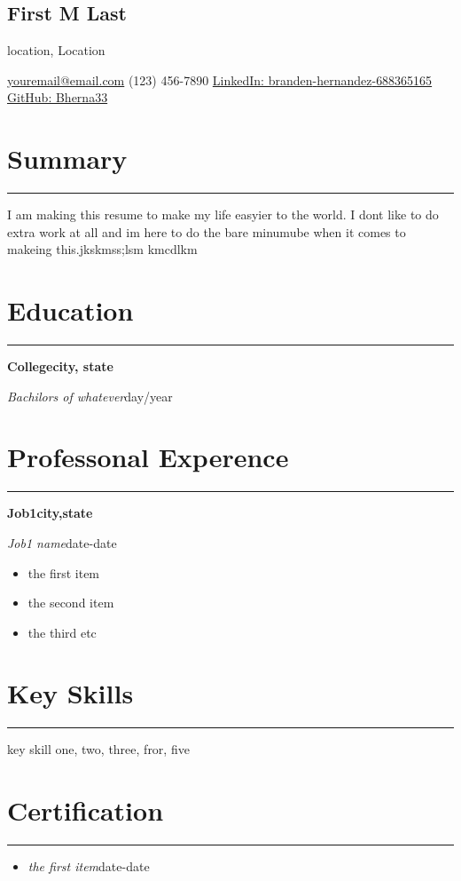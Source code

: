 \documentclass[11pt]{article}%
\begin{document}
%
\normalsize%
%
\setlength\parindent{9pt}%
%
\renewcommand\labelitemi{{-}}%
\pagestyle{empty}%
\renewcommand{\familydefault}{\sfdefault}%
\newcommand{\github}{\textcolor{rgb:red,110;green,84;blue,148}{\faGithubSquare}}%
\newcommand{\linkedIn}{\textcolor{rgb:red,6;green,108;blue,170}{\faLinkedinSquare}}%
\newcommand{\resumesection}[1]{\vspace{-0.5cm}\section*{\color{highlight}#1}\vspace{-0.2cm}\hrule\vspace{0.2cm}}%
\newcommand{\location}[1]{\begin{center}\vspace{-0.1cm}#1\vspace{-0.3cm}\end{center}}%
\newcommand{\contactInfo}[1]{\begin{center}\vspace{-0.1cm}#1\vspace{-0.3cm}\end{center}}%
\newcommand{\name}[1]{\begin{center}\section*{\LARGE \color{highlight}#1}\vspace{-0.8cm}\end{center}}%
\name{First M Last}%
\location{location, Location}%
\contactInfo{\href{mailto:email@domain}{youremail@email.com}{ (123) 456{-}7890 }{\href{https://www.linkedin.com/in/branden{-}hernandez{-}688365165/}{LinkedIn: branden{-}hernandez{-}688365165}}{\href{https://github.com/Bherna33}{ GitHub: Bherna33}}}%
\resumesection{Summary}%
I am making this resume to make my life easyier to the world. I dont like to do extra work at all and im here to do the bare minumube when it comes to makeing this.jkskmss;lsm kmcdlkm%
\resumesection{Education}%
\textbf{College}{\textbf{\hfill {city, state}}}%
\par%
\textit{Bachilors of whatever}{\hfill {day/year}}%
\par%
\resumesection{Professonal Experence}%
\textbf{Job1}{\textbf{\hfill{city,state}}}%
\par%
\textit{Job1 name}{\hfill{date{-}date}}%
\begin{itemize}%
\item%
the first item%
\item%
the second item%
\item%
the third etc%
\end{itemize}%
\resumesection{Key Skills}%
key skill one, two, three, fror, five%
\resumesection{Certification}%
\begin{itemize}%
\item%
\textit{the first item}{\hfill{date{-}date}}%
\end{itemize}%
\end{document}
